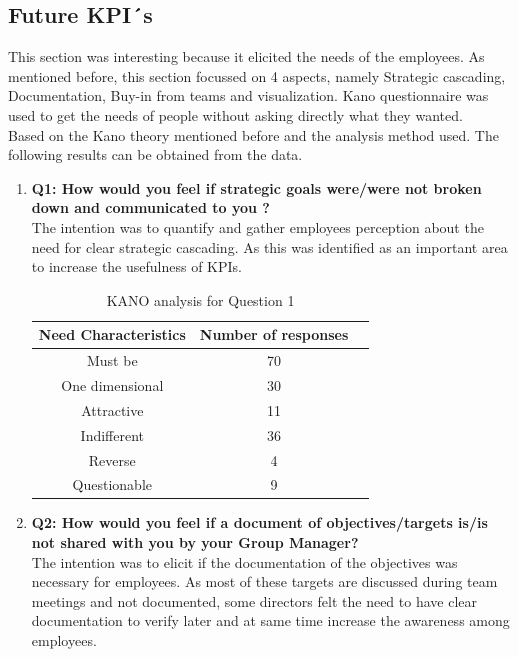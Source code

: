 \subsection{Future KPI´s}
This section was interesting because it elicited the needs of the employees. As mentioned before, this section focussed on 4 aspects, namely Strategic cascading, Documentation, Buy-in from teams and visualization. Kano questionnaire was used to get the needs of people without asking directly what they wanted.  \\

Based on the Kano theory mentioned before and the analysis method used. The following results can be obtained from the data.\\


\begin{enumerate}
    \item \textbf{Q1: How would you feel if strategic goals were/were not broken down and communicated to you ?}\\ 

The intention was to quantify and gather employees perception about the need for clear strategic cascading. As this was identified as an important area to increase the usefulness of KPIs.\\


 
 
\begin{table}[h]
    \centering
    \begin{tabular}{|c|c|c|}
    \hline
    \textbf{Need Characteristics} & \textbf{Number of responses} \\
    \hline
     Must be & 70\\\hline
     One dimensional & 30\\\hline
     Attractive & 11\\\hline
     Indifferent & 36 \\\hline
     Reverse & 4\\\hline
     Questionable & 9\\
    \hline
    \end{tabular}
    \caption{KANO analysis for Question 1}
\end{table}


    \item \textbf{Q2: How would you feel if a document of objectives/targets is/is not shared with you by your Group Manager?}\\

The intention was to elicit if the documentation of the objectives was necessary for employees. As most of these targets are discussed during team meetings and not documented, some directors felt the need to have clear documentation to verify later and at same time increase the awareness among employees.\\


\end{enumerate}
